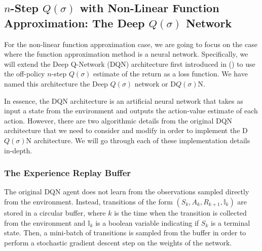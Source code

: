 \begin{algorithm}[H]
\end{algorithm}

\newpage
\subsection{$n$-Step $Q(\sigma)$ with Non-Linear Function Approximation: The Deep $Q(\sigma)$ Network}
\label{sec:dqsigman}

For the non-linear function approximation case, we are going to focus on the case where the function approximation method is a neural network.
Specifically, we will extend the Deep Q-Network (DQN) architecture first introduced in \citeauthor{mnih2015humanlevel} (\citeyear{mnih2015humanlevel}) to use the off-policy $n$-step $Q(\sigma)$ estimate of the return as a loss function.
We have named this architecture the Deep $Q(\sigma)$ network or D$Q(\sigma)$N.

In essence, the DQN architecture is an artificial neural network  that takes as input a state from the environment and outputs the action-value estimate of each action.
However, there are two algorithmic details from the original DQN architecture that we need to consider and modify in order to implement the D$Q(\sigma)$N architecture.
We will go through each of these implementation details in-depth.

\subsubsection{The Experience Replay Buffer}

The original DQN agent does not learn from the observations sampled directly from the environment.
Instead, transitions of the form $(S_k, A_k, R_{k+1}, _k)$ are stored in a circular buffer, where $k$ is the time when the transition is collected from the environment and $_k$ is a boolean variable indicating if $S_k$ is a terminal state. 
Then, a mini-batch of transitions is sampled from the buffer in order to perform a stochastic gradient descent step on the weights of the network.

